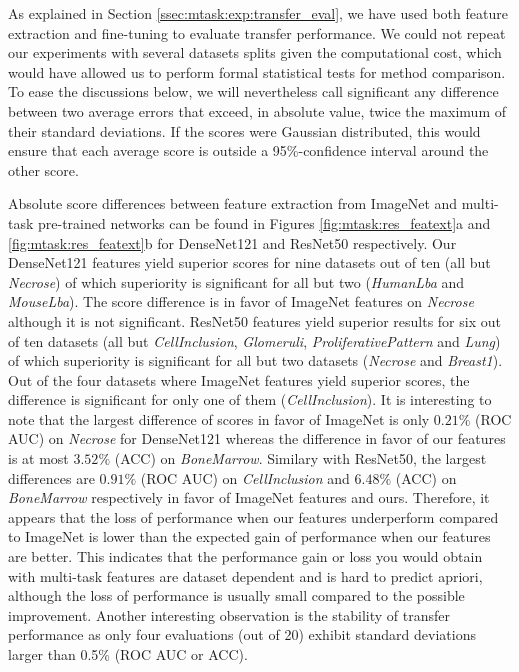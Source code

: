 As explained in Section \ref{ssec:mtask:exp:transfer_eval}, we have used both feature extraction and fine-tuning to evaluate transfer performance. We could not repeat our experiments with several datasets splits given the computational cost, which would have allowed us to perform formal statistical tests for method comparison. To ease the discussions below, we will nevertheless call significant any difference between two average errors that exceed, in absolute value, twice the maximum of their standard deviations. If the scores were Gaussian distributed, this would ensure that each average score is outside a 95\%-confidence interval around the other score.


Absolute score differences between feature extraction from ImageNet and multi-task pre-trained networks can be found in Figures \ref{fig:mtask:res_featext}a and \ref{fig:mtask:res_featext}b for DenseNet121 and ResNet50 respectively. Our DenseNet121 features yield superior scores for nine datasets out of ten (all but \textit{Necrose}) of which superiority is significant for all but two (\textit{HumanLba} and \textit{MouseLba}). The score difference is in favor of ImageNet features on \textit{Necrose} although it is not significant. ResNet50 features yield superior results for six out of ten datasets (all but \textit{CellInclusion}, \textit{Glomeruli}, \textit{ProliferativePattern} and \textit{Lung}) of which superiority is significant for all but two datasets (\textit{Necrose} and \textit{Breast1}). Out of the four datasets where ImageNet features yield superior scores, the difference is significant for only one of them (\textit{CellInclusion}). It is interesting to note that the largest difference of scores in favor of ImageNet is only $0.21\%$ (ROC AUC) on \textit{Necrose} for DenseNet121 whereas the difference in favor of our features is at most $3.52\%$ (ACC) on \textit{BoneMarrow}. Similary with ResNet50, the largest differences are $0.91\%$ (ROC AUC) on \textit{CellInclusion} and $6.48\%$ (ACC) on \textit{BoneMarrow} respectively in favor of ImageNet features and ours. Therefore, it appears that the loss of performance when our features underperform compared to ImageNet is lower than the expected gain of performance when our features are better. This indicates that the performance gain or loss you would obtain with multi-task features are dataset dependent and is hard to predict apriori, although the loss of performance is usually small compared to the possible improvement. Another interesting observation is the stability of transfer performance as only four evaluations (out of 20) exhibit standard deviations larger than 0.5\% (ROC AUC or ACC). 


